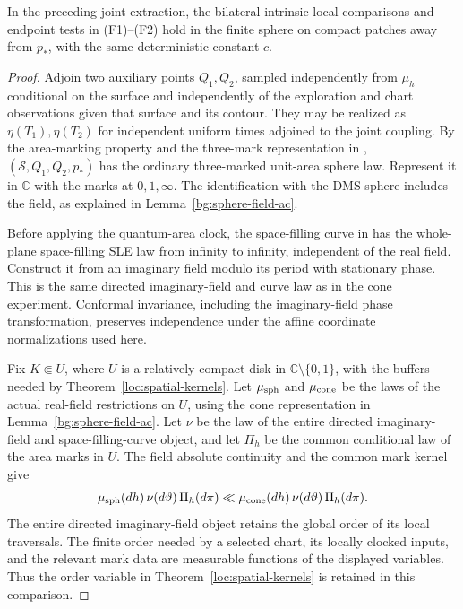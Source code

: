 \begin{lemma}
\label{finite:spatial-field-transfer}
In the preceding joint extraction, the bilateral intrinsic local
comparisons and endpoint tests in (F1)--(F2) hold in the finite sphere
on compact patches away from $p_*$, with the same deterministic
constant $c$.
\end{lemma}
\begin{proof}
Adjoin two auxiliary points $Q_1,Q_2$, sampled independently from
$\mu_h$ conditional on the surface and independently of the exploration
and chart observations given that surface and its contour.  They may
be realized as $\eta(T_1),\eta(T_2)$ for independent uniform times
adjoined to the joint coupling.  By the area-marking property
\cite[Proposition~A.13]{DMS} and the three-mark representation in
\cite[Definition~2.2 and Lemma~2.3]{BorgaGwynneSunPermutons},
$(\mathcal S,Q_1,Q_2,p_*)$ has the ordinary three-marked unit-area
sphere law.  Represent it in $\mathbb C$ with the marks at $0,1,\infty$.
The identification with the DMS sphere includes the field, as explained
in Lemma~\ref{bg:sphere-field-ac}.

Before applying the quantum-area clock, the space-filling curve in
\cite[Theorem~1.1]{MillerSheffieldSphere} has the whole-plane
space-filling SLE law from infinity to infinity, independent of the
real field.  Construct it from an imaginary field modulo its period
with stationary phase.  This is the same directed imaginary-field and
curve law as in the cone experiment.  Conformal invariance, including
the imaginary-field phase transformation, preserves independence under
the affine coordinate normalizations used here.

Fix $K\Subset U$, where $U$ is a relatively compact disk in
$\mathbb C\setminus\{0,1\}$, with the buffers needed by
Theorem~\ref{loc:spatial-kernels}.  Let $\mu_{\rm sph}$ and
$\mu_{\rm cone}$ be the laws of the actual real-field restrictions
on $U$, using the cone representation in
Lemma~\ref{bg:sphere-field-ac}.  Let $\nu$ be the law of the entire
directed imaginary-field and space-filling-curve object, and let
$\Pi_h$ be the common conditional law of the area marks in $U$.
The field absolute continuity and the common mark kernel give
\begin{equation}\label{finite:field-product-ac}
 \mu_{\rm sph}(dh)\,\nu(d\vartheta)\,\Pi_h(d\pi)
 \ll
 \mu_{\rm cone}(dh)\,\nu(d\vartheta)\,\Pi_h(d\pi).
\end{equation}
The entire directed imaginary-field object retains the global order
of its local traversals.  The finite order needed by a selected chart,
its locally clocked inputs, and the relevant mark data are measurable
functions of the displayed variables.  Thus the order variable in
Theorem~\ref{loc:spatial-kernels} is retained in this comparison.


\end{proof}
